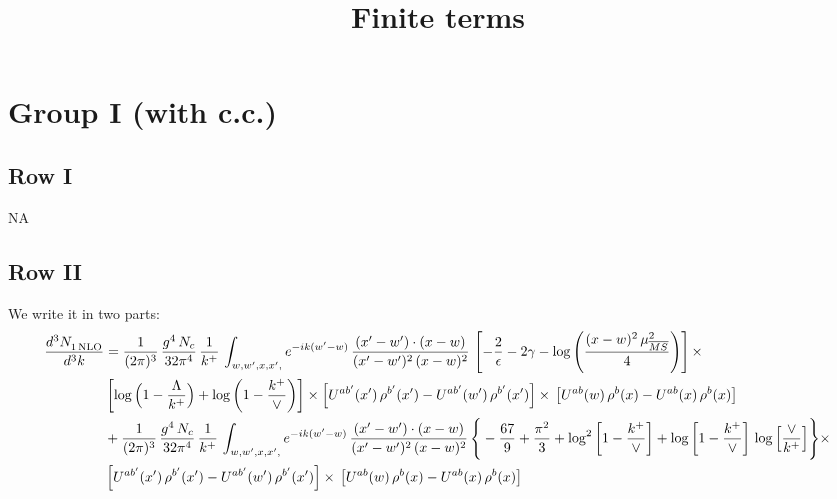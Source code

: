 \documentclass[9pt]{article}
\title{Finite terms}
\author{}
\date{}
\numberwithin{equation}{section}
\begin{document}
\maketitle
\section{Group I (with c.c.)}
\subsection{Row I}
\textsc{NA}
\subsection{Row II}
We write it in two parts:
\begin{align}
     \frac{d^{3}N_{1\,\rm NLO}^{\rm}}{d^{3}k} &  =  \frac{1}{(2\pi)^{3}}\, \frac{g^{4}\,N_{c}}{32\pi^{4}}\,\frac{1}{k^{+}}\, \int_{w, w',x,x',} e^{-ik(w^\prime-w)}\, \frac{(x'-w')\cdot (x-w)}{(x'-w')^{2}\, (x-w)^{2}}\, \left[-\frac{2}{\epsilon}-2\gamma-\log{\left(\frac{(x-w)^{2}\,\mu^{2}_{\overline{MS}}}{4}\right)}\right]\times \notag \\ & \left[\log\Big(1-\frac{\Lambda}{k^{+}}\Big)+\log{\left(1-\frac{k^{+}}{\vee}\right)}\right]\times\left[U^{ab'}(x')\,\rho^{b'}(x') - U^{ab'}(w')\,\rho^{b'}(x')\right]\times\,\left[U^{ab}(w)\,\rho^{b}(x) - U^{ab}(x)\,\rho^{b}(x)\right]\notag \\ & +\frac{1}{(2\pi)^{3}}\, \frac{g^{4}\,N_{c}}{32\pi^{4}}\,\frac{1}{k^{+}}\, \int_{w, w',x,x',} e^{-ik(w^\prime-w)}\, \frac{(x'-w')\cdot (x-w)}{(x'-w')^{2}\, (x-w)^{2}}\, \Bigg\{ -\frac{67}{9}+\frac{\pi^{2}}{3}+\log^{2}{\left[1-\frac{k^{+}}{\vee}\right]}+\log{\left[1-\frac{k^{+}}{\vee}\right]}\,\log{\left[\frac{\vee}{k^{+}}\right]}\Bigg\}\times\notag \\ & \left[U^{ab'}(x')\,\rho^{b'}(x') - U^{ab'}(w')\,\rho^{b'}(x')\right]\times\,\left[U^{ab}(w)\,\rho^{b}(x) - U^{ab}(x)\,\rho^{b}(x)\right]
\end{align}  
\end{document}
